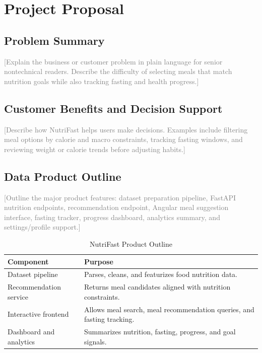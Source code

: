 \documentclass[12pt]{report}
\newcommand{\placeholder}[1]{\textcolor{gray}{[#1]}}
\begin{document}
\chapter{Project Proposal}

\section{Problem Summary}
\placeholder{Explain the business or customer problem in plain language for senior nontechnical readers. Describe the difficulty of selecting meals that match nutrition goals while also tracking fasting and health progress.}

\section{Customer Benefits and Decision Support}
\placeholder{Describe how NutriFast helps users make decisions. Examples include filtering meal options by calorie and macro constraints, tracking fasting windows, and reviewing weight or calorie trends before adjusting habits.}

\section{Data Product Outline}
\placeholder{Outline the major product features: dataset preparation pipeline, FastAPI nutrition endpoints, recommendation endpoint, Angular meal suggestion interface, fasting tracker, progress dashboard, analytics summary, and settings/profile support.}

\begin{table}[H]
    \centering
    \caption{NutriFast Product Outline}
    \begin{tabular}{p{} p{}}
        \toprule
        Component & Purpose \\
        \midrule
        Dataset pipeline & Parses, cleans, and featurizes food nutrition data. \\
        Recommendation service & Returns meal candidates aligned with nutrition constraints. \\
        Interactive frontend & Allows meal search, meal recommendation queries, and fasting tracking. \\
        Dashboard and analytics & Summarizes nutrition, fasting, progress, and goal signals. \\
        \bottomrule
    \end{tabular}
\end{table}
\end{document}
